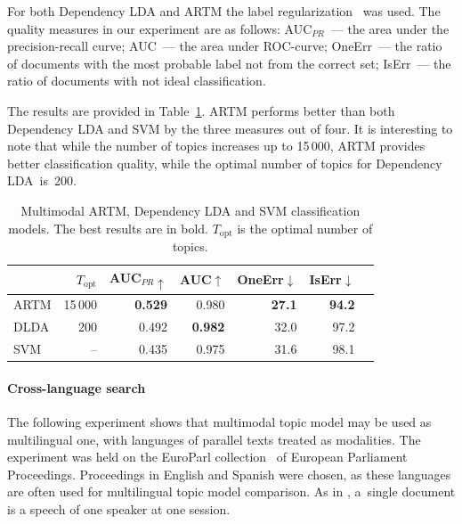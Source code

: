 \documentclass{sig-alternate-2013}
\begin{document}
For both Dependency LDA and ARTM the label regularization~\cite{rubin12statistical} was used.
The quality measures in our experiment are as follows:
AUC$_{PR}$~--- the area under the precision-recall curve;
AUC~--- the area under ROC-curve;
OneErr~--- the ratio of documents with the most probable label not from the correct set;
IsErr~--- the ratio of documents with not ideal classification.

The results are provided in Table~\ref{tab:classification}.
ARTM performs better than both Dependency LDA and SVM by the three measures out of four.
It is interesting to note that
while the number of topics increases up to 15\,000,
ARTM provides better classification quality,
while the optimal number of topics for Dependency LDA~is~200.

\begin{table}[t]
    \caption{Multimodal ARTM, Dependency LDA and SVM classification models.
        The best results are in bold. $T_{\mathrm{opt}}$ is the optimal number of topics.}
    \label{tab:classification}
    \medskip\centering\tabcolsep=5pt
    \begin{tabular}[t]{l|rrrrrr}
    \hline
     & $T_{\mathrm{opt}}$ & AUC$_{PR}\uparrow$ & AUC$\uparrow$ & OneErr$\downarrow$ & IsErr$\downarrow$ \\
    \hline
        ARTM  & 15\,000 & {\bf 0.529} & 0.980       & {\bf 27.1}  & {\bf 94.2}  \\
        DLDA  & 200   & 0.492       & {\bf 0.982} & 32.0        & 97.2        \\
        SVM   & --    & 0.435       & 0.975       & 31.6        & 98.1        \\
    \hline
    \end{tabular}
\end{table}

\paragraph{Cross-language search}
\nopagebreak
The following experiment shows that multimodal topic model may be used as multilingual one,
with languages of parallel texts treated as modalities.
The experiment was held on the \mbox{EuroParl} collection~\cite{koehn05parallel} of European Parliament Proceedings.
Proceedings in English and Spanish were chosen, as these languages are often used for multilingual topic model comparison.
As in \cite{mimno09polylingual,platt10translingual,mimno12sparse},
a~single document is a speech of one speaker at one session.
\end{document}
